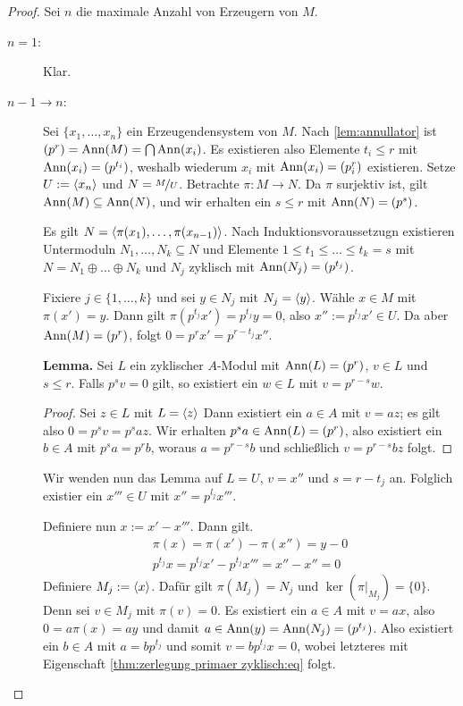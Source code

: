 \documentclass[12pt,a4paper]{scrartcl}
\theoremstyle{cplain}
\theoremstyle{cdef}
\begin{document}
\begin{proof}
	Sei $n$ die maximale Anzahl von Erzeugern von $M$.
	\begin{description}
		\item[$n = 1$:] Klar.
		\item[$n-1\to n$:] Sei $\{x_1,\dots, x_n\}$ ein Erzeugendensystem von $M$. Nach \cref{lem:annullator} ist $(p^r) = \operatorname{Ann}(M)  = \bigcap \operatorname{Ann}(x_i)$. Es existieren also Elemente $t_i\le r$ mit $\operatorname{Ann}(x_i) = (p^{t_i})$, weshalb wiederum $x_i$ mit $\operatorname{Ann}(x_i) = (p_i^r)$ existieren. Setze $U := \langle x_n\rangle$ und $N = \nicefrac{M}{U}$. Betrachte $\pi\colon M\to N$. Da $\pi$ surjektiv ist, gilt $\operatorname{Ann}(M)\subseteq \operatorname{Ann}(N)$, und wir erhalten ein $s\le r$ mit $\operatorname{Ann}(N) = (p^s)$.
		
		Es gilt $N = \langle\pi(x_1),\dots, \pi(x_{n-1})\rangle$. Nach Induktionsvoraussetzugn existieren Untermoduln $N_1,\dots, N_k\subseteq N$ und Elemente $1\le t_1\le\dots \le t_k = s$ mit $N = N_1\oplus \dots \oplus N_k$ und $N_j$ zyklisch mit $\operatorname{Ann}(N_j) = (p^{t_j})$.
		
		
		Fixiere $j\in\{1,\dots, k\}$ und sei $y\in N_j$ mit $N_j = \langle y\rangle$. Wähle $x\in M$ mit $\pi(x') = y$. Dann gilt $\pi(p^{t_j}x') = p^{t_j}y = 0$, also $x'' := p^{t_j}x'\in U$. Da aber $\operatorname{Ann}(M) = (p^r)$, folgt $0 = p^rx' = p^{r-t_j}x''$.
		
		\textbf{Lemma.} Sei $L$ ein zyklischer $A$-Modul mit $\operatorname{Ann}(L) = (p^r)$, $v\in L$ und $s\le r$. Falls $p^sv = 0$ gilt, so existiert ein $w\in L$ mit $v = p^{r-s}w$.
		\begin{proof}
			Sei $z\in L$ mit $L = \langle z\rangle$ Dann existiert ein $a \in A$ mit $v = az$; es gilt also $0 = p^sv = p^saz$. Wir erhalten $p^sa\in \operatorname{Ann}(L) = (p^r)$, also existiert ein $b\in A$ mit $p^sa = p^rb$, woraus $a = p^{r-s}b$ und schließlich $v = p^{r-s}bz$ folgt.
		\end{proof}
			
		Wir wenden nun das Lemma auf $L = U$, $v = x''$ und $s = r-t_j$ an. Folglich existier ein $x'''\in U$ mit $x'' = p^{l_j}x'''$.
		
		Definiere nun $x := x'-x'''$. Dann gilt.
		\begin{gather*}
			\pi(x) = \pi(x')-\pi(x'') = y-0 \\
			p^{t_j}x = p^{t_j}x'-p^{t_j}x''' = x''-x'' = 0 \tag{*} \label{thm:zerlegung primaer zyklisch:eq}
		\end{gather*}
		Definiere $M_j := \langle x\rangle$. Dafür gilt $\pi(M_j) = N_j$ und $\ker(\pi|_{M_j}) = \{0\}$. Denn sei $v\in M_j$ mit $\pi(v) = 0$. Es existiert ein $a\in A$ mit $v = ax$, also $0 = a\pi(x) = ay$ und damit $a \in \operatorname{Ann}(y) = \operatorname{Ann}(N_j) = (p^{t_j})$. Also existiert ein $b\in A$ mit $a = bp^{t_j}$ und somit $v = bp^{t_j}x  = 0$, wobei letzteres mit Eigenschaft \eqref{thm:zerlegung primaer zyklisch:eq} folgt.
		

\end{description}
\end{proof}
\end{document}
